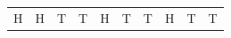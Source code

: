 {{\begin{center}
\begin{xtabular}[t]{|l|l|l|l|l|l|l|l|l|l|}
    
        H &
    
    
        H &
    
    
        T &
    
    
        T &
    
    
        H &
    
    
        T &
    
    
        T &
    
    
        H &
    
    
        T &
    
    
        T%
     \tabularnewline{}
    

\end{xtabular}
\end{center}}}
